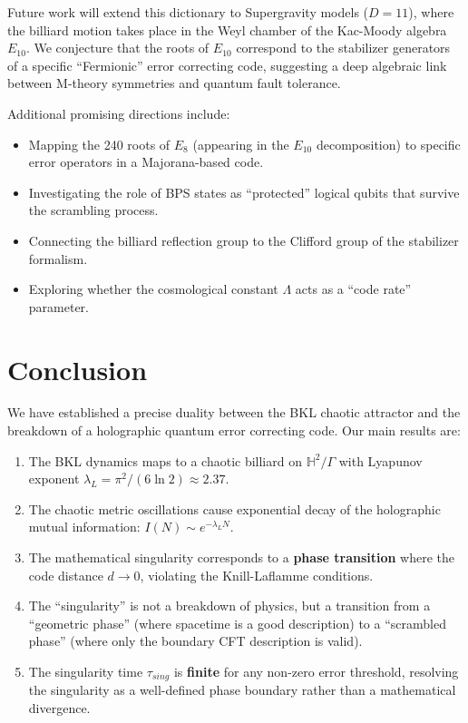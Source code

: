 \documentclass[aps,prd,reprint,nofootinbib,amsmath,amssymb,amsfonts]{revtex4-2}
\begin{document}
Future work will extend this dictionary to Supergravity models ($D=11$), where the billiard motion takes place in the Weyl chamber of the Kac-Moody algebra $E_{10}$. We conjecture that the roots of $E_{10}$ correspond to the stabilizer generators of a specific ``Fermionic'' error correcting code, suggesting a deep algebraic link between M-theory symmetries and quantum fault tolerance.

Additional promising directions include:
\begin{itemize}
    \item Mapping the 240 roots of $E_8$ (appearing in the $E_{10}$ decomposition) to specific error operators in a Majorana-based code.
    \item Investigating the role of BPS states as ``protected'' logical qubits that survive the scrambling process.
    \item Connecting the billiard reflection group to the Clifford group of the stabilizer formalism.
    \item Exploring whether the cosmological constant $\Lambda$ acts as a ``code rate'' parameter.
\end{itemize}

\section{Conclusion}
\label{sec:conclusion}

We have established a precise duality between the BKL chaotic attractor and the breakdown of a holographic quantum error correcting code. Our main results are:

\begin{enumerate}
    \item The BKL dynamics maps to a chaotic billiard on $\mathbb{H}^2/\Gamma$ with Lyapunov exponent $\lambda_L = \pi^2/(6\ln 2) \approx 2.37$.
    
    \item The chaotic metric oscillations cause exponential decay of the holographic mutual information: $I(N) \sim e^{-\lambda_L N}$.
    
    \item The mathematical singularity corresponds to a \textbf{phase transition} where the code distance $d \to 0$, violating the Knill-Laflamme conditions.
    
    \item The ``singularity'' is not a breakdown of physics, but a transition from a ``geometric phase'' (where spacetime is a good description) to a ``scrambled phase'' (where only the boundary CFT description is valid).
    
    \item The singularity time $\tau_{sing}$ is \textbf{finite} for any non-zero error threshold, resolving the singularity as a well-defined phase boundary rather than a mathematical divergence.
\end{enumerate}
\end{document}

